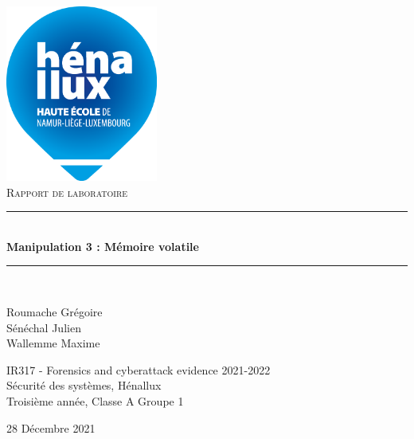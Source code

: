 \documentclass[a4paper]{article}
\newcommand{\HRule}{\rule{\linewidth}{0.5mm}}
\begin{document}
\begin{titlepage}
    \begin{sffamily}
        \begin{center}

            \includegraphics[width=5cm]{images/LogoHenallux.PNG}~\\[1.5cm]
            \textsc{\Large Rapport de laboratoire}\\[1.5cm]

            \HRule \\[0.4cm]
            { \huge \bfseries Manipulation 3 : Mémoire volatile\\[0.4cm] }
            \HRule \\[2cm]

            \begin{minipage}{0.4\textwidth}
                \begin{flushleft} \large
                    Roumache Grégoire\\
                    Sénéchal Julien\\
                    Wallemme Maxime\\
                \end{flushleft}
            \end{minipage}
            \begin{minipage}{0.55\textwidth}
                \begin{flushright} \large
                    IR317 - Forensics and cyberattack evidence 2021-2022\\
                    Sécurité des systèmes, Hénallux\\
                    Troisième année, Classe A Groupe 1 \\
                \end{flushright}
            \end{minipage}
            \vfill

            {\large 28 Décembre 2021}

        \end{center}
    \end{sffamily}
\end{titlepage}
\end{document}
